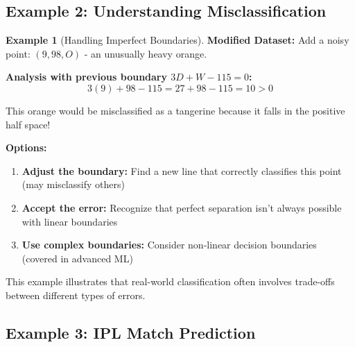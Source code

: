 \documentclass[12pt,a4paper]{article}
\theoremstyle{directpoint}
\theoremstyle{definition}
\newtheorem{example}{Example}[section]
\begin{document}
\subsection{Example 2: Understanding Misclassification}

\begin{example}[Handling Imperfect Boundaries]
\textbf{Modified Dataset:} Add a noisy point: $(9, 98, O)$ - an unusually heavy orange.

\textbf{Analysis with previous boundary $3D + W - 115 = 0$:}
\begin{equation}
3(9) + 98 - 115 = 27 + 98 - 115 = 10 > 0
\end{equation}

This orange would be misclassified as a tangerine because it falls in the positive half space!

\textbf{Options:}
\begin{enumerate}
    \item \textbf{Adjust the boundary:} Find a new line that correctly classifies this point (may misclassify others)
    \item \textbf{Accept the error:} Recognize that perfect separation isn't always possible with linear boundaries
    \item \textbf{Use complex boundaries:} Consider non-linear decision boundaries (covered in advanced ML)
\end{enumerate}

This example illustrates that real-world classification often involves trade-offs between different types of errors.
\end{example}

\subsection{Example 3: IPL Match Prediction}
\end{document}
